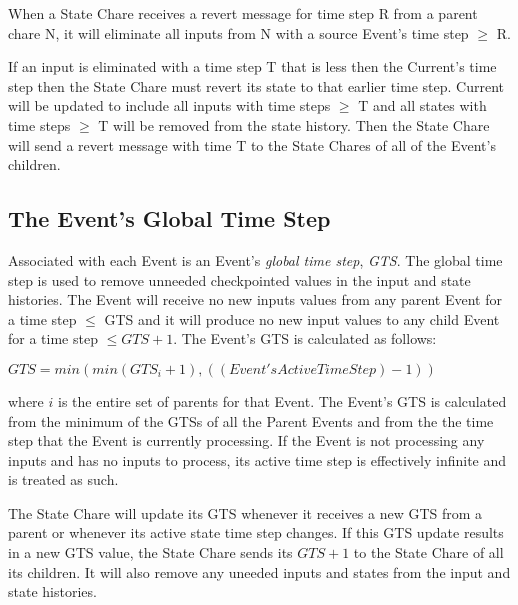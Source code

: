 When a State Chare receives a revert message for time step R from a
parent chare N, it will eliminate all inputs from N with a source
Event's time step $\geq$ R.

If an input is eliminated with a time step T that is less then the
Current's time step then the State Chare must revert its state to that
earlier time step.  Current will be updated to include all inputs with
time steps $\geq$ T and all states with time steps $\geq$ T will be removed
from the state history.  Then the State Chare will send a revert
message with time T to the State Chares of all of the Event's children.

\subsection{The Event's Global Time Step}
\label{globaltime}

Associated with each Event is an Event's {\em global time step}, {\em
GTS}.  The global time step is used to remove unneeded checkpointed
values in the input and state histories.  The Event will receive no
new inputs values from any parent Event for a time step $\leq$ GTS and it
will produce no new input values to any child Event for a time step $\leq
GTS+1$.  The Event's GTS is calculated as follows:

$GTS = min (min(GTS_i + 1), ((Event's Active Time Step)-1))$

where $i$ is the entire set of parents for that Event.  The Event's GTS
is calculated from the minimum of the GTSs of all the Parent Events
and from the the time step that the Event is currently processing.  If
the Event is not processing any inputs and has no inputs to process,
its active time step is effectively infinite and is treated as such.

The State Chare will update its GTS whenever it receives a new GTS
from a parent or whenever its active state time step changes.  If this
GTS update results in a new GTS value, the State Chare sends its
$GTS+1$ to the State Chare of all its children.  It will also remove
any uneeded inputs and states from the input and state histories.

